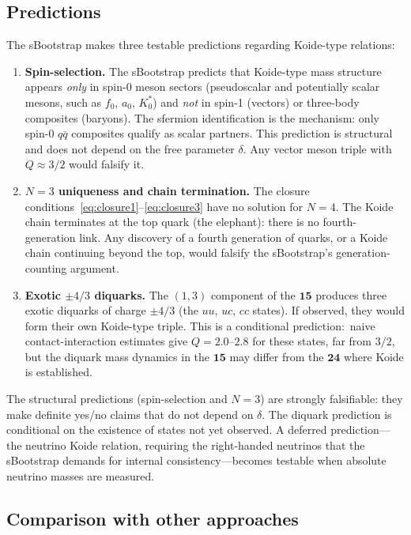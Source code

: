\documentclass[prd,twocolumn,superscriptaddress,nofootinbib]{revtex4-2}
\begin{document}
\subsection{Predictions}
\label{sec:predictions}

The sBootstrap makes three testable predictions regarding
Koide-type relations:
\begin{enumerate}
\item \textbf{Spin-selection.}  The sBootstrap predicts that
  Koide-type mass structure appears \emph{only} in spin-0 meson sectors
  (pseudoscalar and potentially scalar mesons, such as $f_0$, $a_0$,
  $K_0^*$) and \emph{not} in spin-1 (vectors) or three-body composites
  (baryons).  The sfermion identification is the mechanism: only spin-0
  $q\bar{q}$ composites qualify as scalar partners.  This prediction is
  structural and does not depend on the free parameter $\delta$.  Any
  vector meson triple with $Q\approx 3/2$ would falsify it.
\item \textbf{$N=3$ uniqueness and chain termination.}  The closure
  conditions~\eqref{eq:closure1}--\eqref{eq:closure3} have no solution
  for $N=4$.  The Koide chain terminates at the top quark (the
  elephant): there is no fourth-generation link.  Any discovery of a
  fourth generation of quarks, or a Koide chain continuing beyond the
  top, would falsify the sBootstrap's generation-counting argument.
\item \textbf{Exotic $\pm 4/3$ diquarks.}  The $(1,3)$ component of the
  $\mathbf{15}$ produces three exotic diquarks of charge $\pm 4/3$
  (the $uu$, $uc$, $cc$ states).  If observed, they would form their
  own Koide-type triple.  This is a conditional prediction:\ naive
  contact-interaction estimates give $Q=2.0\text{--}2.8$ for these
  states, far from $3/2$, but the diquark mass dynamics in the
  $\mathbf{15}$ may differ from the $\mathbf{24}$ where Koide is
  established.
\end{enumerate}

The structural predictions (spin-selection and $N=3$) are strongly
falsifiable: they make definite yes/no claims that do not depend on
$\delta$.  The diquark prediction is conditional on the existence of
states not yet observed.  A deferred prediction---the neutrino Koide
relation, requiring the right-handed neutrinos that the sBootstrap
demands for internal consistency---becomes testable when absolute
neutrino masses are measured.

\subsection{Comparison with other approaches}
\label{sec:other}
\end{document}
